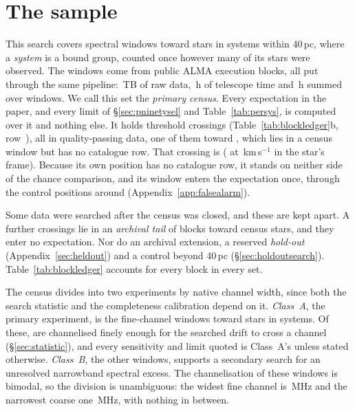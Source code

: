 \section{The sample}
\label{sec:sample}

This search covers \NWindows{} spectral windows toward \NStars{} stars in
\NSystems{} systems within 40\,pc, where a \emph{system} is a bound group,
counted once however many of its stars were observed. The windows come from
\NEB{} public ALMA execution blocks, all put through the same pipeline:
\TotalDataTB\,TB of raw data, \StTelHours\,h of telescope time and
\LdgCensusHours\,h summed over windows. We call this set the \emph{primary
census}. Every expectation in the paper, and every limit of
\S\ref{sec:pninetysel} and Table~\ref{tab:persys}, is computed over it and
nothing else. It holds \CsNCross{} threshold crossings
(Table~\ref{tab:blockledger}b, row~\CtRowCensusCross), all in quality-passing data, one of them toward
\CtUncatStar, which lies in a census window but has no catalogue row.
That crossing is \MbUncatAttrWord{} (\MbUncatTrans{} at \MbUncatDv\,km\,s$^{-1}$
in the star's frame). Because its own position has no catalogue row, it
stands on neither side of the chance comparison, and its window enters the
expectation once, through the control positions around \MbUncatHost{}
(Appendix~\ref{app:falsealarm}).

Some data were searched after the census was closed, and these are kept
apart. A further \CeNTailCross{} crossings lie in an \emph{archival tail} of
\LdgExtTail{} blocks toward \LdgTailStars{} census stars, and they enter no
expectation. Nor do an archival extension, a reserved \emph{hold-out}
(Appendix~\ref{sec:heldout}) and a control beyond 40\,pc
(\S\ref{sec:holdoutsearch}). Table~\ref{tab:blockledger} accounts for every
block in every set.

The census divides into two experiments by native channel width, since both
the search statistic and the completeness calibration depend on it.
\emph{Class~A}, the primary experiment, is the \NWinA{} fine-channel windows
toward \LdgClassAStars{} stars in \NSysClassA{} systems. Of these,
\EtaDriftAOk{} are channelised finely enough for the searched drift to cross a
channel (\S\ref{sec:statistic}), and every sensitivity and limit quoted is
Class~A's unless stated otherwise. \emph{Class~B}, the other \NWinB{}
windows, supports a secondary search for an unresolved narrowband spectral
excess. The channelisation of these windows is bimodal, so the division is
unambiguous: the widest fine channel is \ScChanFineMaxMHz\,MHz and the
narrowest coarse one \ScChanCoarseMinMHz\,MHz, with nothing in between.

